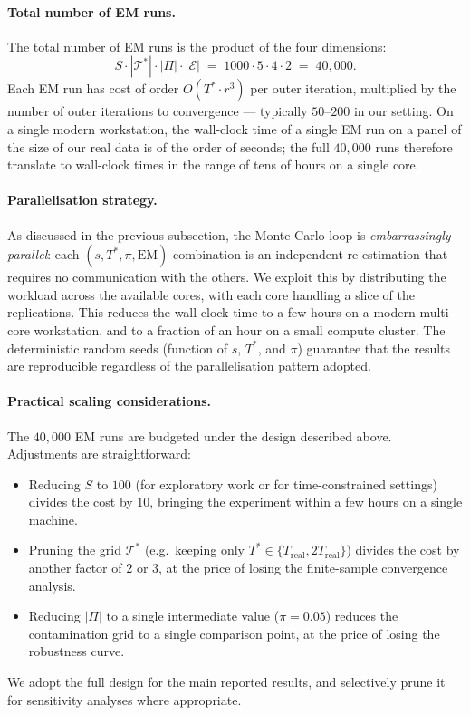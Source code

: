 \documentclass[11pt, a4paper, oneside]{article}
\begin{document}
\paragraph{Total number of EM runs.}
The total number of EM runs is the product of the four dimensions:
\[
S \cdot |\mathcal{T}^*| \cdot |\Pi| \cdot |\mathcal{E}|
\;=\; 1000 \cdot 5 \cdot 4 \cdot 2 \;=\; 40{,}000.
\]
Each EM run has cost of order $O(T^* \cdot r^3)$ per outer
iteration, multiplied by the number of outer iterations to
convergence — typically $50$--$200$ in our setting. On a single
modern workstation, the wall-clock time of a single EM run on a
panel of the size of our real data is of the order of seconds; the
full $40{,}000$ runs therefore translate to wall-clock times in the
range of tens of hours on a single core.

\paragraph{Parallelisation strategy.}
As discussed in the previous subsection, the Monte Carlo loop is
\emph{embarrassingly parallel}: each
$(s, T^*, \pi, \mathrm{EM})$ combination is an independent
re-estimation that requires no communication with the others. We
exploit this by distributing the workload across the available
cores, with each core handling a slice of the replications. This
reduces the wall-clock time to a few hours on a modern multi-core
workstation, and to a fraction of an hour on a small compute
cluster. The deterministic random seeds (function of
$s$, $T^*$, and $\pi$) guarantee that the results are
reproducible regardless of the parallelisation pattern adopted.

\paragraph{Practical scaling considerations.}
The $40{,}000$ EM runs are budgeted under the design described
above. Adjustments are straightforward:
\begin{itemize}[leftmargin=1.5em, itemsep=3pt]
    \item Reducing $S$ to $100$ (for exploratory work or for
          time-constrained settings) divides the cost by $10$,
          bringing the experiment within a few hours on a single
          machine.
    \item Pruning the grid $\mathcal{T}^*$ (e.g.\ keeping only
          $T^* \in \{T_{\mathrm{real}}, 2 T_{\mathrm{real}}\}$)
          divides the cost by another factor of $2$ or $3$, at
          the price of losing the finite-sample convergence
          analysis.
    \item Reducing $|\Pi|$ to a single intermediate value
          ($\pi = 0.05$) reduces the contamination grid to a
          single comparison point, at the price of losing the
          robustness curve.
\end{itemize}
We adopt the full design for the main reported results, and
selectively prune it for sensitivity analyses where appropriate.
\end{document}
